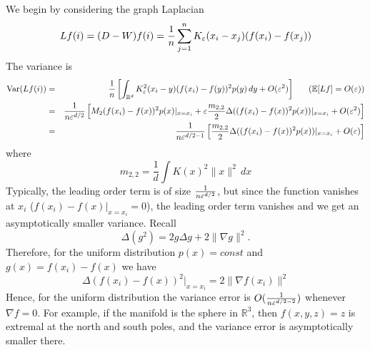 We begin by considering the graph Laplacian
$$Lf(i) = (D - W)f(i) = \frac{1}{n}\sum_{j=1}^n K_{\varepsilon}(x_i-x_j) (f(x_i)-f(x_j))$$
The variance is
\begin{eqnarray*}
\text{Var}(Lf(i)) &=& \frac{1}{n}\left[\int_{\mathbb{R}^d} K_{\varepsilon}^2(x_i-y)(f(x_i)-f(y))^2p(y)\,dy + O(\varepsilon^2)  \right] ~~~~~ (\mathbb{E}[Lf]=O(\varepsilon))\\
&=& \frac{1}{n\varepsilon^{d/2}}\left[M_2 (f(x_i)-f(x))^2p(x)|_{x=x_i} + \varepsilon \frac{m_{2,2}}{2}\Delta ((f(x_i)-f(x))^2p(x))|_{x=x_i} + O(\varepsilon^2) \right] \\
&=& \frac{1}{n\varepsilon^{d/2-1}} \left[\frac{m_{2,2}}{2}\Delta ((f(x_i)-f(x))^2p(x))|_{x=x_i} + O(\varepsilon) \right]
\end{eqnarray*}
where
$$m_{2,2} = \frac{1}{d}\int K(x)^2 \|x\|^2\,dx$$
Typically, the leading order term is of size $\frac{1}{n\varepsilon^{d/2}}$, but since the function vanishes at $x_i$ ($f(x_i) - f(x)|_{x=x_i} = 0$), the leading order term vanishes and we get an asymptotically smaller variance.
Recall
$$\Delta (g^2) = 2g\Delta g + 2\|\nabla g\|^2.$$
Therefore, for the uniform distribution $p(x)=const$ and $g(x)=f(x_i)-f(x)$ we have
$$\Delta(f(x_i)-f(x))^2|_{x=x_i} = 2\|\nabla f(x_i)\|^2$$
Hence, for the uniform distribution the variance error is $O(\frac{1}{n\varepsilon^{d/2-2}})$ whenever $\nabla f = 0$. For example, if the manifold is the sphere in $\mathbb{R}^3$, then $f(x,y,z)=z$ is extremal at the north and south poles, and the variance error is asymptotically smaller there.


